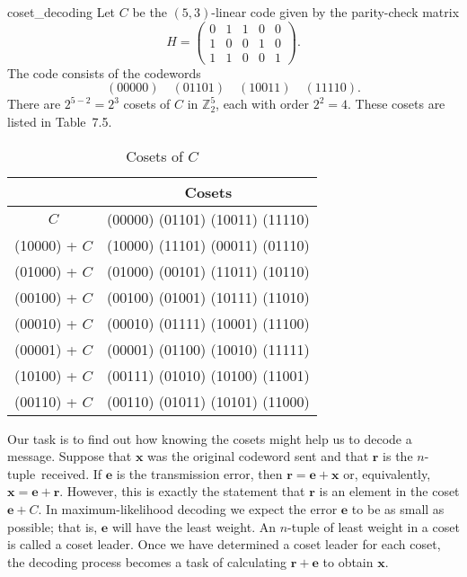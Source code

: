  
\begin{example}{coset_decoding}
Let $C$ be the $(5,3)$-linear code given by the parity-check matrix
\[
H =
\begin{pmatrix}
0 & 1 & 1 & 0 & 0 \\
1 & 0 & 0 & 1 & 0 \\
1 & 1 & 0 & 0 & 1
\end{pmatrix}.
\]
The code consists of the codewords
\[
(00000) \quad (01101) \quad (10011) \quad (11110).
\]
There are $2^{5-2} = 2^3$ cosets of $C$ in ${\mathbb Z}_2^5$, each with
order $2^2 =4$.  These cosets are listed in Table~7.5. 
\end{example}
 
 
\begin{table}
{\small
\begin{center}
\medskip
\begin{tabular}{|c|c|}
\hline
 & Cosets \\
\hline
          $C$ & (00000)  (01101)  (10011)  (11110) \\
(10000) + $C$ & (10000)  (11101)  (00011)  (01110) \\
(01000) + $C$ & (01000)  (00101)  (11011)  (10110) \\
(00100) + $C$ & (00100)  (01001)  (10111)  (11010) \\
(00010) + $C$ & (00010)  (01111)  (10001)  (11100) \\
(00001) + $C$ & (00001)  (01100)  (10010)  (11111) \\
(10100) + $C$ & (00111)  (01010)  (10100)  (11001) \\
(00110) + $C$ & (00110)  (01011)  (10101)  (11000) \\
\hline
\end{tabular}
\end{center}
}
\caption{Cosets of $C$}
\end{table}
 
 

 
 
Our task is to find out how knowing the cosets might help us to 
decode a
message. Suppose that ${\mathbf x}$ was the original codeword sent and
that ${\mathbf r}$ is the \mbox{$n$-tuple received}. If ${\mathbf e}$ is the
transmission error, then ${\mathbf r} = {\mathbf e} + {\mathbf x}$ or,
equivalently, ${\mathbf x} = {\mathbf e} + {\mathbf r}$. However, this is
exactly the statement that ${\mathbf r}$ is an element in the coset 
${\mathbf e} + C$. In maximum-likelihood decoding we expect the error
${\mathbf e}$ to be as small as possible; that is, ${\mathbf e}$ will have
the least weight. An $n$-tuple of least weight in a coset is called a
{\bfi coset leader}. Once we have determined a
coset leader for each coset, the decoding process becomes a task
of calculating ${\mathbf r} + {\mathbf e}$ to obtain ${\mathbf x}$.
 
